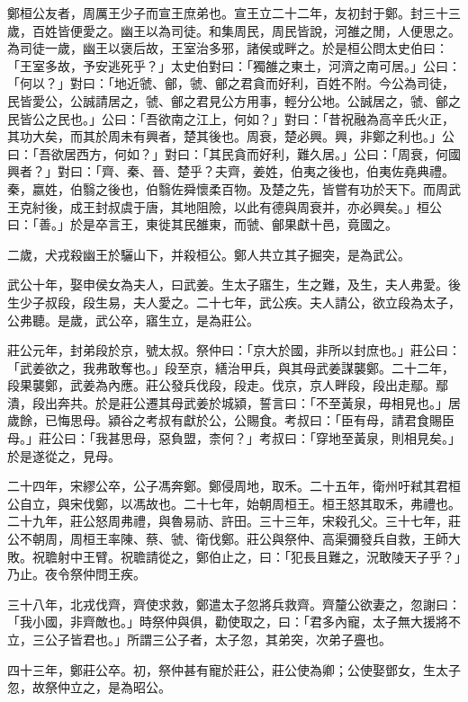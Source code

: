 
\begin{pinyinscope}
鄭桓公友者，周厲王少子而宣王庶弟也。宣王立二十二年，友初封于鄭。封三十三歲，百姓皆便愛之。幽王以為司徒。和集周民，周民皆說，河雒之閒，人便思之。為司徒一歲，幽王以褒后故，王室治多邪，諸侯或畔之。於是桓公問太史伯曰：「王室多故，予安逃死乎？」太史伯對曰：「獨雒之東土，河濟之南可居。」公曰：「何以？」對曰：「地近虢、鄶，虢、鄶之君貪而好利，百姓不附。今公為司徒，民皆愛公，公誠請居之，虢、鄶之君見公方用事，輕分公地。公誠居之，虢、鄶之民皆公之民也。」公曰：「吾欲南之江上，何如？」對曰：「昔祝融為高辛氏火正，其功大矣，而其於周未有興者，楚其後也。周衰，楚必興。興，非鄭之利也。」公曰：「吾欲居西方，何如？」對曰：「其民貪而好利，難久居。」公曰：「周衰，何國興者？」對曰：「齊、秦、晉、楚乎？夫齊，姜姓，伯夷之後也，伯夷佐堯典禮。秦，嬴姓，伯翳之後也，伯翳佐舜懷柔百物。及楚之先，皆嘗有功於天下。而周武王克紂後，成王封叔虞于唐，其地阻險，以此有德與周衰并，亦必興矣。」桓公曰：「善。」於是卒言王，東徙其民雒東，而虢、鄶果獻十邑，竟國之。

二歲，犬戎殺幽王於驪山下，并殺桓公。鄭人共立其子掘突，是為武公。

武公十年，娶申侯女為夫人，曰武姜。生太子寤生，生之難，及生，夫人弗愛。後生少子叔段，段生易，夫人愛之。二十七年，武公疾。夫人請公，欲立段為太子，公弗聽。是歲，武公卒，寤生立，是為莊公。

莊公元年，封弟段於京，號太叔。祭仲曰：「京大於國，非所以封庶也。」莊公曰：「武姜欲之，我弗敢奪也。」段至京，繕治甲兵，與其母武姜謀襲鄭。二十二年，段果襲鄭，武姜為內應。莊公發兵伐段，段走。伐京，京人畔段，段出走鄢。鄢潰，段出奔共。於是莊公遷其母武姜於城潁，誓言曰：「不至黃泉，毋相見也。」居歲餘，已悔思母。潁谷之考叔有獻於公，公賜食。考叔曰：「臣有母，請君食賜臣母。」莊公曰：「我甚思母，惡負盟，柰何？」考叔曰：「穿地至黃泉，則相見矣。」於是遂從之，見母。

二十四年，宋繆公卒，公子馮奔鄭。鄭侵周地，取禾。二十五年，衛州吁弒其君桓公自立，與宋伐鄭，以馮故也。二十七年，始朝周桓王。桓王怒其取禾，弗禮也。二十九年，莊公怒周弗禮，與魯易祊、許田。三十三年，宋殺孔父。三十七年，莊公不朝周，周桓王率陳、蔡、虢、衛伐鄭。莊公與祭仲、高渠彌發兵自救，王師大敗。祝聸射中王臂。祝聸請從之，鄭伯止之，曰：「犯長且難之，況敢陵天子乎？」乃止。夜令祭仲問王疾。

三十八年，北戎伐齊，齊使求救，鄭遣太子忽將兵救齊。齊釐公欲妻之，忽謝曰：「我小國，非齊敵也。」時祭仲與俱，勸使取之，曰：「君多內寵，太子無大援將不立，三公子皆君也。」所謂三公子者，太子忽，其弟突，次弟子亹也。

四十三年，鄭莊公卒。初，祭仲甚有寵於莊公，莊公使為卿；公使娶鄧女，生太子忽，故祭仲立之，是為昭公。


\end{pinyinscope}

